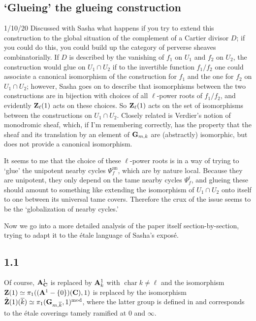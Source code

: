 \documentclass[deligne.tex]{subfiles}
\begin{document}
\subsection*{`Glueing' the glueing construction}
1/10/20 Discussed with Sasha what happens if you try to extend this 
construction to the global situation of the complement of a Cartier divisor
$D$; if you could do this, you could build up the category of perverse
sheaves combinatorially. If $D$ is described by the vanishing of $f_1$ on
$U_1$ and $f_2$ on $U_2$, the construction would glue on $U_1\cap U_2$ if
to the invertible function $f_1/f_2$ one could associate a canonical 
isomorphism of the construction for $f_1$ and the one for $f_2$ on
$U_1\cap U_2$; however, Sasha goes on to describe that isomorphisms between
the two constructions are in bijection with choices of all $\ell$-power 
roots of $f_1/f_2$, and evidently $\mathbf{Z}_\ell(1)$ acts on these choices.
So $\mathbf{Z}_\ell(1)$ acts on the set of isomorphisms between the constructions
on $U_1\cap U_2$. Closely related is Verdier's notion of monodromic sheaf,
which, if I'm remembering correctly, has the property that the sheaf and its
translation by an element of $\mathbf{G}_{m,k}$ are (abstractly) isomorphic, but
does not provide a canonical isomorphism.

It seems to me that the choice of these $\ell$-power roots is in a way of
trying to `glue' the unipotent nearby cycles $\Psi_f^{\mathrm{un}}$, which
are by nature local. Because they are unipotent, they only depend on the
tame nearby cycles $\Psi_f^t$, and glueing these should amount to something
like extending the isomorphism of $U_1\cap U_2$ onto itself to one between 
its universal tame covers. Therefore the crux of the issue seems to be the
`globalization of nearby cycles.'

Now we go into a more detailed analysis of the paper itself
section-by-section, trying to adapt it to the étale language of Sasha's
exposé.

\subsection*{1.1}\label{glue:1.1}
Of course, $\mathbf{A}^1_{\mathbf{C}}$ is replaced by $\mathbf{A}^1_k$ with
$\operatorname{char} k\ne\ell$ and the isomorphism
$\mathbf{Z}(1)\simeq\pi_1((\mathbf{A}^1-\{0\})(\mathbf{C}),1)$ is replaced by the isomorphism
$\hat{\mathbf{Z}}(1)(\overline k)\simeq\pi_1(\mathbf{G}_{m,\overline k},1)^{\mathrm{mod}}$,
where the latter group is defined in \cite[2.2.2]{Laumon} and corresponds to
the étale coverings tamely ramified at 0 and $\infty$.
\end{document}
